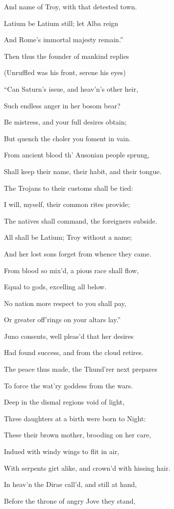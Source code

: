And name of Troy, with that detested town.

Latium be Latium still; let Alba reign

And Rome’s immortal majesty remain.”

Then thus the founder of mankind replies

(Unruffled was his front, serene his eyes)

“Can Saturn’s issue, and heav’n’s other heir,

Such endless anger in her bosom bear?

Be mistress, and your full desires obtain;

But quench the choler you foment in vain.

From ancient blood th’ Ausonian people sprung,

Shall keep their name, their habit, and their tongue.

The Trojans to their customs shall be tied:

I will, myself, their common rites provide;

The natives shall command, the foreigners subside.

All shall be Latium; Troy without a name;

And her lost sons forget from whence they came.

From blood so mix’d, a pious race shall flow,

Equal to gods, excelling all below.

No nation more respect to you shall pay,

Or greater off’rings on your altars lay.”

Juno consents, well pleas’d that her desires

Had found success, and from the cloud retires.

The peace thus made, the Thund’rer next prepares

To force the wat’ry goddess from the wars.

Deep in the dismal regions void of light,

Three daughters at a birth were born to Night:

These their brown mother, brooding on her care,

Indued with windy wings to flit in air,

With serpents girt alike, and crown’d with hissing hair.

In heav’n the Dirae call’d, and still at hand,

Before the throne of angry Jove they stand,

